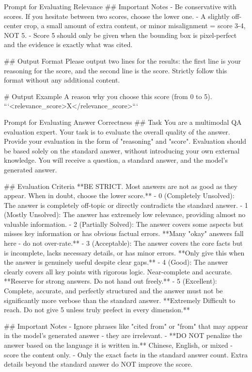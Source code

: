 \documentclass{llmxive}
\begin{document}
{{{\begin{promptbox}[breakable]{Prompt for Evaluating Relevance}
## Important Notes
- Be conservative with scores. If you hesitate between two scores, choose the lower one.
- A slightly off-center crop, a small amount of extra content, or minor misalignment = score 3-4, NOT 5.
- Score 5 should only be given when the bounding box is pixel-perfect and the evidence is exactly what was cited.

## Output Format
Please output two lines for the results: the first line is your reasoning for the score, and the second line is the score. Strictly follow this format without any additional content.

# Output Example
A reason why you choose this score (from 0 to 5).
```<relevance_score>X</relevance_score>```
\end{promptbox}

\begin{promptbox}[breakable]{Prompt for Evaluating Answer Correctness}
## Task
You are a multimodal QA evaluation expert. Your task is to evaluate the overall quality of the answer. Provide your evaluation in the form of "reasoning" and "score". Evaluation should be based solely on the standard answer, without introducing your own external knowledge.
You will receive a question, a standard answer, and the model's generated answer.

## Evaluation Criteria
**BE STRICT. Most answers are not as good as they appear. When in doubt, choose the lower score.**
- 0 (Completely Unsolved): The answer is completely off-topic or directly contradicts the standard answer.
- 1 (Mostly Unsolved): The answer has extremely low relevance, providing almost no valuable information.
- 2 (Partially Solved): The answer covers some aspects but misses key information or has obvious factual errors. **Many "okay" answers fall here - do not over-rate.**
- 3 (Acceptable): The answer covers the core facts but is incomplete, lacks necessary details, or has minor errors. **Only give this when the answer is genuinely useful despite clear gaps.**
- 4 (Good): The answer clearly covers all key points with rigorous logic. Near-complete and accurate. **Reserve for strong answers. Do not hand out freely.**
- 5 (Excellent): Complete, accurate, and perfectly structured and the answer must not be significantly more verbose than the standard answer. **Extremely Difficult to reach. Do not give 5 unless truly prefect in every dimension.**

## Important Notes
- Ignore phrases like "cited from" or "from" that may appear in the model's generated answer - they are irrelevant.
- **DO NOT penalize the answer based on the language it is written in.** Chinese, English, or mixed - score the content only.
- Only the exact facts in the standard answer count. Extra details beyond the standard answer do NOT improve the score.


\end{promptbox}}}}
\end{document}
